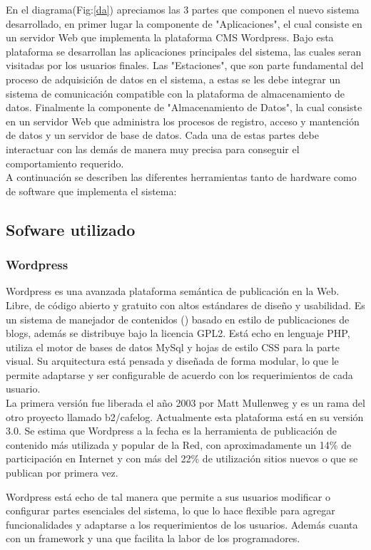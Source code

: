 En el diagrama(Fig:\ref{da}) apreciamos las 3 partes que componen el nuevo sistema desarrollado, en primer lugar la componente de "Aplicaciones", el cual consiste en un servidor Web que implementa la plataforma CMS Wordpress. Bajo esta plataforma se desarrollan las aplicaciones principales del sistema, las cuales seran visitadas por los usuarios finales. Las "Estaciones", que son parte fundamental del proceso de adquisición de datos en el sistema,  a estas se les debe integrar un sistema de comunicación compatible con la plataforma de almacenamiento de datos. Finalmente la componente de "Almacenamiento de Datos", la cual consiste en un servidor Web que administra los procesos de registro, acceso y mantención de datos y un servidor de base de datos. Cada una de estas partes debe interactuar con las demás de manera muy precisa para conseguir el comportamiento requerido.\\

A continuación se describen las diferentes herramientas tanto de hardware como de software que implementa el sistema:

\subsection{Sofware utilizado}
\subsubsection{Wordpress}
Wordpress es una avanzada plataforma semántica de publicación en la Web. Libre, de código abierto y gratuito con altos estándares de diseño y usabilidad. Es un sistema de manejador de contenidos () basado en estilo de publicaciones de blogs, además se distribuye bajo la licencia GPL2. Está echo en lenguaje PHP, utiliza el motor de bases de datos MySql y hojas de estilo CSS para la parte visual. Su arquitectura está pensada y diseñada de forma modular, lo que le permite adaptarse y ser configurable de acuerdo con los requerimientos de cada usuario.\\
La primera versión fue liberada el año 2003 por Matt Mullenweg y es un rama del otro proyecto llamado b2/cafelog. Actualmente esta plataforma está en su versión 3.0. Se estima que Wordpress a la fecha es la herramienta de publicación de contenido más utilizada y popular de la Red, con aproximadamente un 14\% de participación en Internet y con más del 22\% de utilización sitios nuevos o que se publican por primera vez.

Wordpress está echo de tal manera que permite a sus usuarios modificar o configurar partes esenciales del sistema, lo que lo hace flexible para agregar funcionalidades y adaptarse a los requerimientos de los usuarios. Además cuanta con un framework y una  que facilita la labor de los programadores.\\

